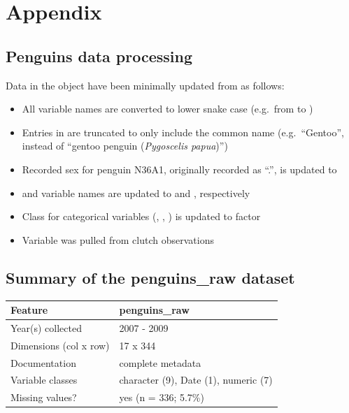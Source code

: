 \hypertarget{appendix}{%
\section*{Appendix}\label{appendix}}

\hypertarget{penguins-data-processing}{%
\subsection{Penguins data processing}\label{penguins-data-processing}}

Data in the  object have been minimally updated from
 as follows:

\begin{itemize}
\tightlist
\item
  All variable names are converted to lower snake case (e.g.~from
   to )
\item
  Entries in  are truncated to only include the common
  name (e.g.~``Gentoo'', instead of ``gentoo penguin (\emph{Pygoscelis
  papua})'')
\item
  Recorded sex for penguin N36A1, originally recorded as ``.'', is
  updated to 
\item
   and  variable names
  are updated to  and ,
  respectively
\item
  Class for categorical variables (, ,
  ) is updated to factor
\item
  Variable  was pulled from clutch observations
\end{itemize}

\hypertarget{summary-of-the-penguins_raw-dataset}{%
\subsection{\texorpdfstring{Summary of the \textbf{penguins\_raw}
dataset}{Summary of the penguins\_raw dataset}}\label{summary-of-the-penguins_raw-dataset}}

\begin{Schunk}

\begin{tabular}{ll}
\toprule
Feature & penguins\_raw\\
\midrule
Year(s) collected & 2007 - 2009\\
Dimensions (col x row) & 17 x 344\\
Documentation & complete metadata\\
Variable classes & character (9), Date (1), numeric (7)\\
Missing values? & yes (n = 336; 5.7\%)\\
\bottomrule
\end{tabular}

\end{Schunk}


